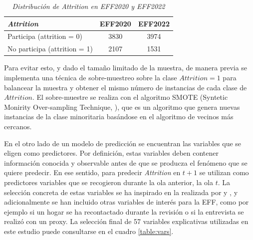 \begin{table}[htbp]
\centering{}
\begin{tabular}{lcc}
\textbf{\textit{Attrition}}           & \textbf{EFF2020} & \textbf{EFF2022} \\ \hline
Participa (attrition = 0)    & 3830             & 3974             \\
No participa (attrition = 1) & 2107             & 1531             \\ \hline
\end{tabular}
\caption{\textit{Distribución de Attrition en EFF2020 y EFF2022}}
\label{table:attrition}
\end{table}

Para evitar esto, y dado el tamaño limitado de la muestra, de manera previa se implementa una técnica de sobre-muestreo sobre la clase $Attrition=1$ para balancear la muestra y obtener el mismo número de instancias de cada clase de $Attrition$. El sobre-muestre se realiza con el algoritmo SMOTE (Syntetic Monirity Over-sampling Technique, \cite{chawla2002smote}), que es un algoritmo que genera nuevas instancias de la clase minoritaria basándose en el algoritmo de vecinos más cercanos.

En el otro lado de un modelo de predicción se encuentran las variables que se eligen como predictores. Por definición, estas variables deben contener información conocida y observable antes de que se producza el fenómeno que se quiere predecir. En ese sentido, para predecir \textit{Attrition} en $t+1$ se utilizan como predictores variables que se recogieron durante la ola anterior, la ola $t$. La selección concreta de estas variables se ha inspirado en la realizada por \cite{beste2023case} y \cite{kern2021predicting}, y adicionalmente se han incluido otras variables de interés para la EFF, como por ejemplo si un hogar se ha recontactado durante la revisión o si la entrevista se realizó con un proxy. La selección final de 57 variables explicativas utilizadas en este estudio puede consultarse en el cuadro \ref{table:vars}.

